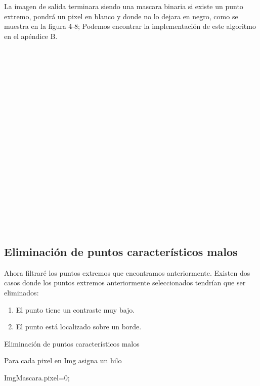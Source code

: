 La imagen de salida terminara siendo una mascara binaria si existe un punto extremo, pondrá un pixel en blanco y donde no lo dejara en negro, como se muestra en la figura 4-8; Podemos encontrar la implementación de este algoritmo en el apéndice B.\\\\\\\\\\\\\\\\\\\\\\\\\\\\\\\\\\\\\\\ \pagebreak






\subsection{Eliminación de puntos característicos malos}

Ahora filtraré los puntos extremos que encontramos anteriormente. Existen dos casos donde los puntos extremos anteriormente seleccionados tendrían que ser eliminados:
	\begin{enumerate}
		\item El punto tiene un contraste muy bajo.
		\item El punto está localizado sobre un borde.
	\end{enumerate}		

\begin{algorithm}[H]
\caption{Eliminación de puntos característicos malos}
 Para cada pixel en Img asigna un hilo\;
 
 {
	{
		{
			ImgMascara.pixel=0;
		}
	
				
	}
	
	
		
}
	
\end{algorithm}

